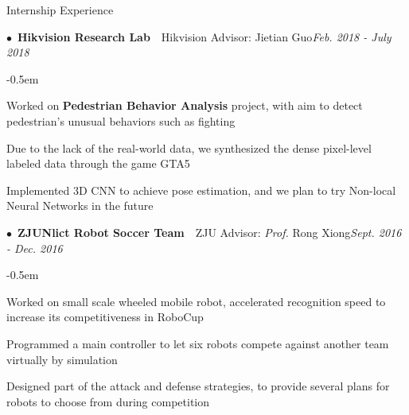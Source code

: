 \documentclass{resume} %
\begin{document}
\begin{rSection}{Internship Experience}

\begin{spacing}{0.4}
$\bullet$~{\bf Hikvision Research Lab}~~{Hikvision Advisor: Jietian Guo}\hfill{\em Feb. 2018 - July 2018}\smallskip\\
\end{spacing}
\begin{list}{--}{\leftmargin=1em}
	\itemsep -0.5em \vspace{-0.5em}
\item Worked on {\bf Pedestrian Behavior Analysis} project, with aim to detect pedestrian's unusual behaviors such as fighting
\item Due to the lack of the real-world data, we synthesized the dense pixel-level labeled data through the game GTA5
\item Implemented 3D CNN	 to achieve pose estimation, and we plan to try Non-local Neural Networks in the future

\end{list}

\begin{spacing}{0.4}
$\bullet$~{\bf ZJUNlict Robot Soccer Team}~~{ZJU Advisor: {\em Prof.} Rong Xiong}\hfill{\em Sept. 2016 - Dec. 2016}\smallskip\\
\end{spacing}
\begin{list}{--}{\leftmargin=1em}
	\itemsep -0.5em \vspace{-0.5em}
\item Worked on small scale wheeled mobile robot, accelerated recognition speed to increase its competitiveness in RoboCup
\item Programmed a main controller to let six robots compete against another team virtually by simulation
\item Designed part of the attack and defense strategies, to provide several plans for robots to choose from during competition

\end{list}

\end{rSection}
\end{document}
